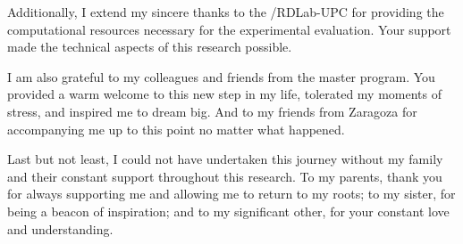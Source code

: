 Additionally, I extend my sincere thanks to the /RDLab-UPC for providing the computational resources necessary for the experimental evaluation. Your support made the technical aspects of this research possible.

I am also grateful to my colleagues and friends from the master program. You provided a warm welcome to this new step in my life, tolerated my moments of stress, and inspired me to dream big. And to my friends from Zaragoza for accompanying me up to this point no matter what happened.

Last but not least, I could not have undertaken this journey without my family and their constant support throughout this research. To my parents, thank you for always supporting me and allowing me to return to my roots; to my sister, for being a beacon of inspiration; and to my significant other, for your constant love and understanding.




\tableofcontents
